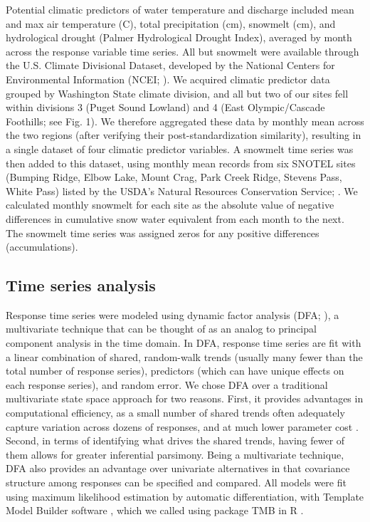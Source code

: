 \documentclass[notitlepage]{article}
\begin{document}
Potential climatic predictors of water temperature and discharge included mean and max air temperature (\degree C), total precipitation (cm), snowmelt (cm), and hydrological drought (Palmer Hydrological Drought Index), averaged by month across the response variable time series. All but snowmelt were available through the U.S. Climate Divisional Dataset, developed by the National Centers for Environmental Information (NCEI; \citealt{climateData}). We acquired climatic predictor data grouped by Washington State climate division, and all but two of our sites fell within divisions 3 (Puget Sound Lowland) and 4 (East Olympic/Cascade Foothills; see Fig. 1). We therefore aggregated these data by monthly mean across the two regions (after verifying their post-standardization similarity), resulting in a single dataset of four climatic predictor variables. A snowmelt time series was then added to this dataset, using monthly mean records from six SNOTEL sites (Bumping Ridge, Elbow Lake, Mount Crag, Park Creek Ridge, Stevens Pass, White Pass) listed by the USDA's Natural Resources Conservation Service; \citealt{snowData}. We calculated monthly snowmelt for each site as the absolute value of negative differences in cumulative snow water equivalent from each month to the next. The snowmelt time series was assigned zeros for any positive differences (accumulations).


\subsection*{Time series analysis}
Response time series were modeled using dynamic factor analysis (DFA; \citealt{zuur2003estimating}), a multivariate technique that can be thought of as an analog to principal component analysis in the time domain. In DFA, response time series are fit with a linear combination of shared, random-walk trends (usually many fewer than the total number of response series), predictors (which can have unique effects on each response series), and random error. We chose DFA over a traditional multivariate state space approach for two reasons. First, it provides advantages in computational efficiency, as a small number of shared trends often adequately capture variation across dozens of responses, and at much lower parameter cost \citep{zuur2003dynamic}. Second, in terms of identifying what drives the shared trends, having fewer of them allows for greater inferential parsimony. Being a multivariate technique, DFA also provides an advantage over univariate alternatives in that covariance structure among responses can be specified and compared. All models were fit using maximum likelihood estimation by automatic differentiation, with Template Model Builder software \citep{kristensen2015tmb}, which we called using package TMB in R \citep{Rmanual,tmbPackage}.
\end{document}
